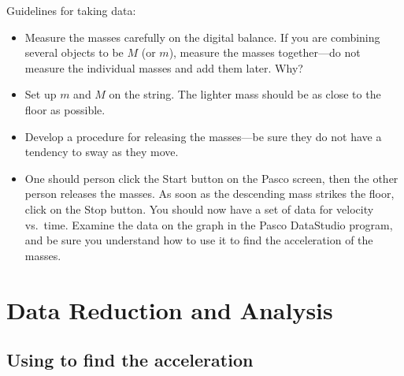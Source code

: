 Guidelines for taking data:
\begin{itemize}
\item Measure the masses carefully on the digital balance.  If you are
combining several objects to be $M$ (or $m$),
measure the masses
together---do not measure the individual masses and add them later.
Why?
%
\item Set up $m$ and $M$ on the string.  The lighter mass should be
as close to the floor as possible.
%
\item Develop a procedure for releasing the masses---be sure they do
not have a tendency to sway as they move.
%
\item One should person click the Start button on the Pasco screen, then the
other person releases the masses.
As soon as the descending mass
strikes the floor, click on the Stop button.  You should now have a
set of data for velocity vs.\ time.   Examine the data on the graph in
the Pasco DataStudio program, and be sure you understand how to
use it to find the acceleration of the masses.
%
\end{itemize}

\section*{Data Reduction and Analysis}
\subsection*{Using \WAPP to find the acceleration}

